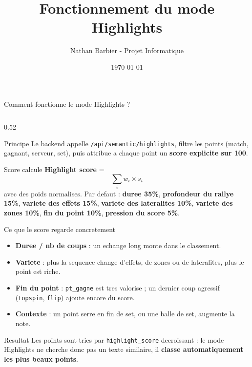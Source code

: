 \documentclass[aspectratio=169, 11pt]{beamer}
\title[Highlights]{Fonctionnement du mode Highlights}
\author{Nathan Barbier - Projet Informatique}
\date{\today}
\begin{document}
\begin{frame}{Comment fonctionne le mode Highlights ?}
    \begin{columns}[T,onlytextwidth]
        \begin{column}{0.52\textwidth}
            {\small
            \begin{block}{Principe}
                Le backend appelle \texttt{/api/semantic/highlights}, filtre les points
                (match, gagnant, serveur, set), puis attribue a chaque point un
                \textbf{score explicite sur 100}.
            \end{block}

            \begin{block}{Score calcule}
                \textbf{Highlight score} =
                \[
                \sum_i w_i \times s_i
                \]
                avec des poids normalises. Par defaut :
                \textbf{duree 35\%}, \textbf{profondeur du rallye 15\%},
                \textbf{variete des effets 15\%},
                \textbf{variete des lateralites 10\%},
                \textbf{variete des zones 10\%},
                \textbf{fin du point 10\%},
                \textbf{pression du score 5\%}.
            \end{block}

            \begin{block}{Ce que le score regarde concretement}
                \begin{itemize}
                    \item \textbf{Duree / nb de coups} : un echange long monte dans le classement.
                    \item \textbf{Variete} : plus la sequence change d'effets, de zones ou de lateralites, plus le point est riche.
                    \item \textbf{Fin du point} : \texttt{pt\_gagne} est tres valorise ; un dernier coup agressif (\texttt{topspin}, \texttt{flip}) ajoute encore du score.
                    \item \textbf{Contexte} : un point serre en fin de set, ou une balle de set, augmente la note.
                \end{itemize}
            \end{block}

            \begin{alertblock}{Resultat}
                Les points sont tries par \texttt{highlight\_score} decroissant :
                le mode Highlights ne cherche donc pas un texte similaire,
                il \textbf{classe automatiquement les plus beaux points}.
            \end{alertblock}
            }
        \end{column}


\end{columns}
\end{frame}
\end{document}
